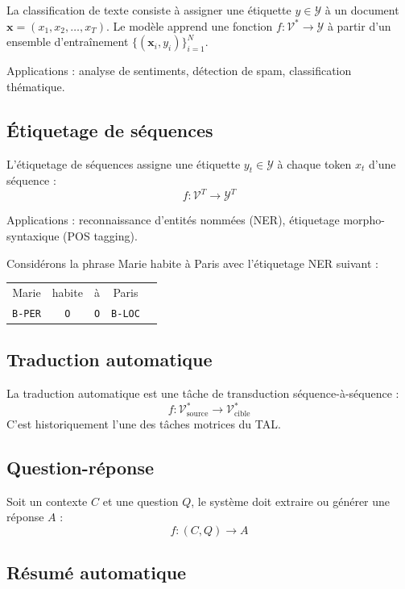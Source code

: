 La classification de texte consiste \`a assigner une \'etiquette $y \in \mathcal{Y}$
\`a un document $\mathbf{x} = (x_1, x_2, \ldots, x_T)$. Le mod\`ele apprend
une fonction $f : \mathcal{V}^* \to \mathcal{Y}$ \`a partir d'un ensemble
d'entra\^inement $\{(\mathbf{x}_i, y_i)\}_{i=1}^{N}$.

Applications : analyse de sentiments, d\'etection de spam, classification
th\'ematique.

\subsection{\'Etiquetage de s\'equences}

L'\'etiquetage de s\'equences assigne une \'etiquette $y_t \in \mathcal{Y}$
\`a chaque token $x_t$ d'une s\'equence :
\[
f : \mathcal{V}^T \to \mathcal{Y}^T
\]

Applications : reconnaissance d'entit\'es nomm\'ees (NER), \'etiquetage
morpho-syntaxique (POS tagging).

\begin{exemple}
Consid\'erons la phrase \og Marie habite \`a Paris \fg avec l'\'etiquetage
NER suivant :
\begin{center}
\begin{tabular}{ccccc}
Marie & habite & \`a & Paris \\
\texttt{B-PER} & \texttt{O} & \texttt{O} & \texttt{B-LOC}
\end{tabular}
\end{center}
\end{exemple}

\subsection{Traduction automatique}

La traduction automatique est une t\^ache de transduction s\'equence-\`a-s\'equence :
\[
f : \mathcal{V}_{\text{source}}^* \to \mathcal{V}_{\text{cible}}^*
\]
C'est historiquement l'une des t\^aches motrices du TAL.

\subsection{Question-r\'eponse}

Soit un contexte $C$ et une question $Q$, le syst\`eme doit extraire ou
g\'en\'erer une r\'eponse $A$ :
\[
f : (C, Q) \to A
\]

\subsection{R\'esum\'e automatique}

